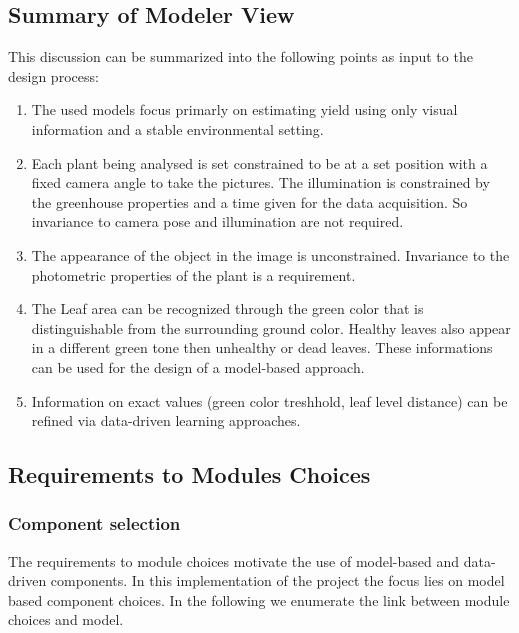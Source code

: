 \graphicspath{{members/paz/figures/}}

\subsection{Summary of Modeler View}\label{subsec:summary-of-modeler-view}


This discussion can be summarized into the following points as input to the
design process:

\begin{enumerate}
    \item The used models focus primarly on estimating yield using only visual information and a stable environmental setting.
    
    \item Each plant being analysed is set constrained to be at a set position with a fixed camera angle to take the pictures. The illumination is constrained by the greenhouse properties and a time given for the data acquisition. So invariance to camera pose and illumination are not required.
    
    \item The appearance of the object in the image is unconstrained. Invariance to the photometric properties of the plant is a requirement.
    
    \item The Leaf area can be recognized through the green color that is distinguishable from the surrounding ground color. Healthy leaves also appear in a  different green tone then unhealthy or dead leaves. These informations can be used for the design of a model-based approach.
    
    \item Information on exact values (green color treshhold, leaf level distance) can be refined via data-driven learning approaches.
    
\end{enumerate}

\subsection{Requirements to Modules Choices}


\subsubsection*{Component selection}

The requirements to module choices motivate the use of model-based and data-driven components. In this implementation of the project the focus lies on model based component choices. In the following we enumerate the link between module choices and model.

